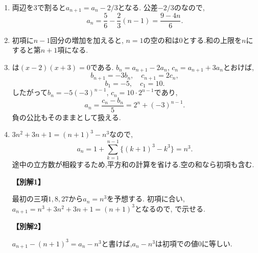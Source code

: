 \begin{enumerate}[label=\textbf{問\arabic*.},leftmargin=3.8em,format=\bookitemlink{practice-basic}{solution}{problem}]
          \item 両辺を$3$で割ると$a_{n+1}=a_n-2/3$となる.
                  公差$-2/3$のなので,
                  \[
                    a_n=\frac56-\frac23(n-1)=\frac{9-4n}{6}.
                  \]

          \item 初項に$n-1$回分の増加を加えると,
                  \BookMathLayout{\[
                  \begin{aligned}
                    a_n&=2+\sum_{k=1}^{n-1}(3k-1)\\
                       &=2+\frac{3n(n-1)}2-(n-1)
                        =\frac{3n^2-5n+6}{2}.
                  \end{aligned}
                  \]}{\[
                  \begin{aligned}
                    a_n&=2+\sum_{k=1}^{n-1}(3k-1)\\
                       &=2+\frac{3n(n-1)}2-(n-1)\\
                       &=\frac{3n^2-5n+6}{2}.
                  \end{aligned}
                  \]}
                  $n=1$の空の和は$0$とする.和の上限を$n$にすると第$n+1$項になる.

          \item {}は$(x-2)(x+3)=0$である.
                  $b_n=a_{n+1}-2a_n$, $c_n=a_{n+1}+3a_n$とおけば,
                  \[
                    b_{n+1}=-3b_n,\quad c_{n+1}=2c_n,
                  \]
                  \[
                    b_1=-5,\quad c_1=10.
                  \]
                  したがって$b_n=-5(-3)^{n-1}$, $c_n=10\cdot2^{n-1}$であり,
                  \[
                    a_n=\frac{c_n-b_n}{5}=2^n+(-3)^{n-1}.
                  \]
                  負の公比もそのままとして扱える.

          \item $3n^2+3n+1=(n+1)^3-n^3$なので,
                  \[
                    a_n=1+\sum_{k=1}^{n-1}\{(k+1)^3-k^3\}=n^3.
                  \]
                  途中の立方数が相殺するため,平方和の計算を省ける.空の和なら初項も含む.
                  \par\smallskip\noindent\textbf{【別解1】}\par
                  最初の三項$1,8,27$から$a_n=n^3$を予想する.
                  初項に合い,$a_{n+1}=n^3+3n^2+3n+1=(n+1)^3$となるので,
                  で示せる.
                  \par\smallskip\noindent\textbf{【別解2】}\par
                  $a_{n+1}-(n+1)^3=a_n-n^3$と書けば,$a_n-n^3$は初項での値$0$に等しい.


\end{enumerate}

